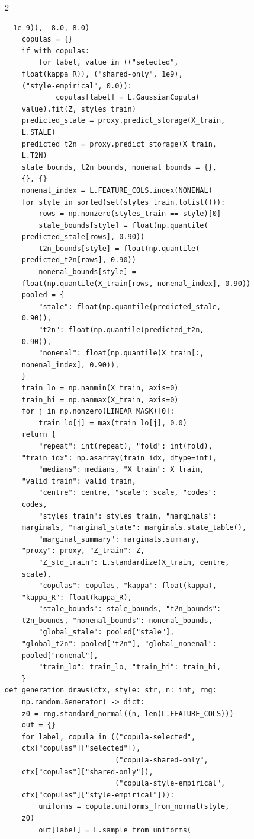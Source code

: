\begin{multicols}{2}
\begin{Verbatim}[fontsize=\scriptsize]
    - 1e-9)), -8.0, 8.0)
    copulas = {}
    if with_copulas:
        for label, value in (("selected",
    float(kappa_R)), ("shared-only", 1e9),
    ("style-empirical", 0.0)):
            copulas[label] = L.GaussianCopula(
    value).fit(Z, styles_train)
    predicted_stale = proxy.predict_storage(X_train,
    L.STALE)
    predicted_t2n = proxy.predict_storage(X_train,
    L.T2N)
    stale_bounds, t2n_bounds, nonenal_bounds = {},
    {}, {}
    nonenal_index = L.FEATURE_COLS.index(NONENAL)
    for style in sorted(set(styles_train.tolist())):
        rows = np.nonzero(styles_train == style)[0]
        stale_bounds[style] = float(np.quantile(
    predicted_stale[rows], 0.90))
        t2n_bounds[style] = float(np.quantile(
    predicted_t2n[rows], 0.90))
        nonenal_bounds[style] =
    float(np.quantile(X_train[rows, nonenal_index], 0.90))
    pooled = {
        "stale": float(np.quantile(predicted_stale,
    0.90)),
        "t2n": float(np.quantile(predicted_t2n,
    0.90)),
        "nonenal": float(np.quantile(X_train[:,
    nonenal_index], 0.90)),
    }
    train_lo = np.nanmin(X_train, axis=0)
    train_hi = np.nanmax(X_train, axis=0)
    for j in np.nonzero(LINEAR_MASK)[0]:
        train_lo[j] = max(train_lo[j], 0.0)
    return {
        "repeat": int(repeat), "fold": int(fold),
    "train_idx": np.asarray(train_idx, dtype=int),
        "medians": medians, "X_train": X_train,
    "valid_train": valid_train,
        "centre": centre, "scale": scale, "codes":
    codes,
        "styles_train": styles_train, "marginals":
    marginals, "marginal_state": marginals.state_table(),
        "marginal_summary": marginals.summary,
    "proxy": proxy, "Z_train": Z,
        "Z_std_train": L.standardize(X_train, centre,
    scale),
        "copulas": copulas, "kappa": float(kappa),
    "kappa_R": float(kappa_R),
        "stale_bounds": stale_bounds, "t2n_bounds":
    t2n_bounds, "nonenal_bounds": nonenal_bounds,
        "global_stale": pooled["stale"],
    "global_t2n": pooled["t2n"], "global_nonenal":
    pooled["nonenal"],
        "train_lo": train_lo, "train_hi": train_hi,
    }
def generation_draws(ctx, style: str, n: int, rng:
    np.random.Generator) -> dict:
    z0 = rng.standard_normal((n, len(L.FEATURE_COLS)))
    out = {}
    for label, copula in (("copula-selected",
    ctx["copulas"]["selected"]),
                          ("copula-shared-only",
    ctx["copulas"]["shared-only"]),
                          ("copula-style-empirical",
    ctx["copulas"]["style-empirical"])):
        uniforms = copula.uniforms_from_normal(style,
    z0)
        out[label] = L.sample_from_uniforms(

\end{Verbatim}
\end{multicols}

